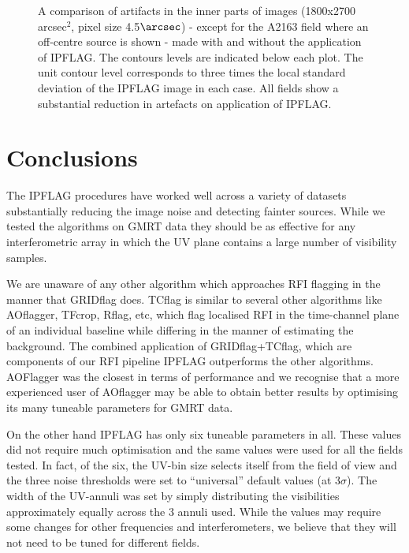 \documentclass[twocolumn]{aastex61}
\begin{document}
{{\begin{figure*}[htbp]

\caption{A comparison of artifacts in the inner parts of images (1800x2700
arcsec$^2$, pixel size 4.5$\arcsec$) - except for the A2163 field where an
off-centre source is shown -  made with and without the application of
IPFLAG. The contours levels are indicated below each plot. The
unit contour level corresponds to three times the local standard deviation
of the IPFLAG image in each case. All fields show a substantial
reduction in artefacts on application of IPFLAG.}

   \label{fig:postage_stamps}
\end{figure*}


\section{Conclusions}

The IPFLAG procedures have worked well across a variety of datasets
substantially reducing the image noise and detecting fainter sources.  While we
tested the algorithms on GMRT data they should be as effective for any
interferometric array in which the UV plane contains a large number of
visibility samples.

We are unaware of any other algorithm which approaches RFI flagging in
the manner that GRIDflag does. TCflag is similar to several other algorithms
like AOflagger, TFcrop, Rflag, etc, which flag localised RFI in the
time-channel plane of an individual baseline while differing in the manner of
estimating the background. The combined application of GRIDflag+TCflag, which
are components of our RFI pipeline IPFLAG outperforms the other algorithms.
AOFlagger was the closest in terms of performance and we recognise that a more
experienced user of AOflagger may be able to obtain better results by
optimising its many tuneable parameters for GMRT data.

On the other hand IPFLAG has only six tuneable parameters in all.  These values
did not require much optimisation and the same values were used for all the
fields tested. In fact, of the six, the UV-bin size selects itself from the
field of view and the three noise thresholds were set to ``universal'' default
values (at 3$\sigma$). The width of the UV-annuli was set by simply distributing
the visibilities approximately equally across the 3 annuli used.  While the
values may require some changes for other frequencies and interferometers, we
believe that they will not need to be tuned for different fields.

}}
\end{document}
